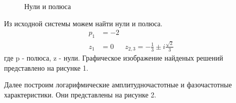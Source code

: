 \documentclass[a4paper, 12pt]{article}
\begin{document}
\noindent
\begin{minipage}[t]{0.5\textwidth}
    \begin{figure} [H]
        \centering
        \caption{Нули и полюса}
    \end{figure}
\end{minipage}
\begin{minipage}[t]{0.5\textwidth}
    \vspace{0.5cm}
    Из исходной системы можем найти нули и полюса.
    \begin{align*}
        p_1 & = -2 \\
        z_1 & = 0 & z_{2, 3} = -\frac{1}{3} \pm i\frac{\sqrt{2}}{3}
    \end{align*}
    где p - полюса, z - нули. Графическое изображение найденых решений представлено на рисунке 1.
\end{minipage}
\vspace{0.5cm} \par

Далее построим логарифмические амплитудночастотные и фазочастотные характеристики. Они представлены на рисунке 2.
\end{document}
